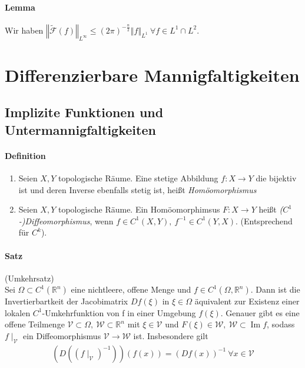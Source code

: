 \documentclass[12pt,a4paper,fleqn]{article}
\DeclareMathOperator{\im}{Im}
\def\norm#1{{\left\Vert #1 \right\Vert}}
\def\R{{\mathbb{R}}}
\begin{document}
\paragraph{Lemma} Wir haben $\norm{\widetilde{\mathscr{F}}(f)}_{L^\infty} \leq (2\pi)^{-\frac{n}{2}} \norm{f}_{L^1}\ \forall f \in L^1 \cap L^2$.

\section{Differenzierbare Mannigfaltigkeiten}

\subsection{Implizite Funktionen und Untermannigfaltigkeiten}

\paragraph{Definition}
\begin{enumerate}
\item Seien $X, Y$ topologische Räume. Eine stetige Abbildung $f\colon X \rightarrow Y$ die bijektiv ist und deren Inverse ebenfalls stetig ist, heißt \textit{Homöomorphismus}
\item Seien $X, Y$ topologische Räume. Ein Homöomorphimsus $F\colon X \rightarrow Y$ heißt \textit{($C^1$-)Diffeomorphismus}, wenn $f \in C^1(X, Y),\ f^{-1} \in C^1(Y, X)$. (Entsprechend für $C^k$).
\end{enumerate}

\paragraph{Satz} (Umkehrsatz)\\
Sei $\Omega \subset C^1(\R^n)$ eine nichtleere, offene Menge und $f \in C^1(\Omega, \R^n)$. Dann ist die Invertierbartkeit der Jacobimatrix $Df(\xi)$ in $\xi \in \Omega$ äquivalent zur Existenz einer lokalen $C^1$-Umkehrfunktion von f in einer Umgebung $f(\xi)$. Genauer gibt es eine offene Teilmenge $\mathcal{V} \subset \Omega,\ \mathcal{W} \subset \R^n$ mit $\xi \in \mathcal{V}$ und $F(\xi) \in \mathcal{W},\ \mathcal{W} \subset \im f$, sodass $f\mid_\mathcal{V}$ ein Diffeomorphismus $\mathcal{V} \rightarrow \mathcal{W}$ ist. Insbesondere gilt
\begin{align*}
(D((f\mid_\mathcal{V})^{-1}))(f(x)) = (Df(x))^{-1}\ \forall x \in \mathcal{V}
\end{align*}
\end{document}
